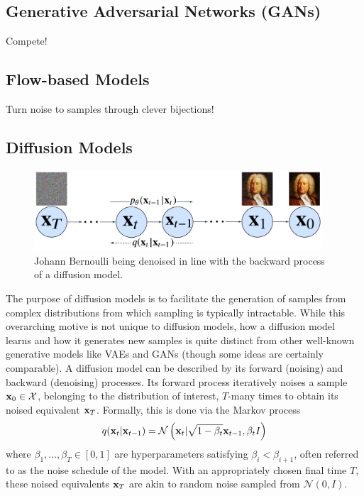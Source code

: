 \documentclass[11pt]{article}
\begin{document}
\subsection{Generative Adversarial Networks (GANs)}
Compete!

\subsection{Flow-based Models}
Turn noise to samples through clever bijections!

\subsection{Diffusion Models}

\begin{figure}[ht]
    \centering
    \includegraphics[height=3cm]{./figures/generative_models/diffusion_process.pdf}
    \caption{Johann Bernoulli being denoised in line with the backward process of a diffusion model.}
    \label{fig:diffusion_process}
\end{figure}

The purpose of diffusion models is to facilitate the generation of samples from complex distributions from which sampling is typically intractable. While this overarching motive is not unique to diffusion models, how a diffusion model learns and how it generates new samples is quite distinct from other well-known generative models like VAEs and GANs (though some ideas are certainly comparable). A diffusion model can be described by its forward (noising) and backward (denoising) processes. Its forward process iteratively noises a sample $\mathbf{x}_0\in\mathcal{X}$, belonging to the distribution of interest, $T$-many times to obtain its noised equivalent $\mathbf{x}_T$. Formally, this is done via the Markov process
$$
q(\mathbf{x}_t|\mathbf{x}_{t-1})
=
\mathcal{N}\left(\mathbf{x}_t|\sqrt{1-\beta_t}\mathbf{x}_{t-1},\beta_tI\right)
$$
where $\beta_1,\dots,\beta_T\in[0,1]$ are hyperparameters satisfying $\beta_i<\beta_{i+1}$, often referred to as the noise schedule of the model. With an appropriately chosen final time $T$, these noised equivalents $\mathbf{x}_T$ are akin to random noise sampled from $\mathcal{N}(0,I)$.
\end{document}
